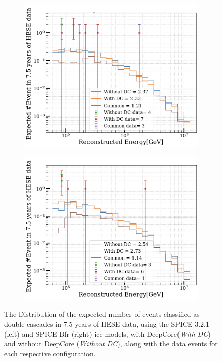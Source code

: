 \begin{figure}
    \begin{subfigure}[h]{0.7\textwidth}
        \includegraphics{./figures/results/Spice_DCwithdata.png}
    \end{subfigure}
    \hfill
    \begin{subfigure}[h]{0.7\textwidth}
        \includegraphics{./figures/results/Bfr_DCwithdata.png}
       
    \end{subfigure}%
    \caption{The Distribution of the expected number of events classified as double cascades in 7.5 years of HESE data, using the SPICE-3.2.1 (left) and SPICE-Bfr (right) ice models, with DeepCore(\emph{With DC}) and without DeepCore (\emph{Without DC}), along with the data events for each respective configuration.}
\end{figure}

